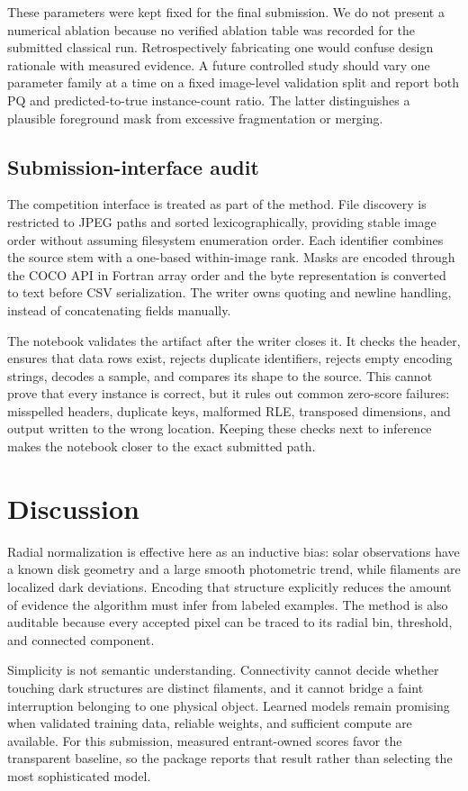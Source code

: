 \documentclass[sigconf]{acmart}
\begin{document}
These parameters were kept fixed for the final submission. We do not present a
numerical ablation because no verified ablation table was recorded for the
submitted classical run. Retrospectively fabricating one would confuse design
rationale with measured evidence. A future controlled study should vary one
parameter family at a time on a fixed image-level validation split and report
both PQ and predicted-to-true instance-count ratio. The latter distinguishes a
plausible foreground mask from excessive fragmentation or merging.

\subsection{Submission-interface audit}
The competition interface is treated as part of the method. File discovery is
restricted to JPEG paths and sorted lexicographically, providing stable image
order without assuming filesystem enumeration order. Each identifier combines
the source stem with a one-based within-image rank. Masks are encoded through
the COCO API in Fortran array order and the byte representation is converted to
text before CSV serialization. The writer owns quoting and newline handling,
instead of concatenating fields manually.

The notebook validates the artifact after the writer closes it. It checks the
header, ensures that data rows exist, rejects duplicate identifiers, rejects
empty encoding strings, decodes a sample, and compares its shape to the source.
This cannot prove that every instance is correct, but it rules out common
zero-score failures: misspelled headers, duplicate keys, malformed RLE,
transposed dimensions, and output written to the wrong location. Keeping these
checks next to inference makes the notebook closer to the exact submitted path.

\section{Discussion}
Radial normalization is effective here as an inductive bias: solar observations
have a known disk geometry and a large smooth photometric trend, while filaments
are localized dark deviations. Encoding that structure explicitly reduces the
amount of evidence the algorithm must infer from labeled examples. The method is
also auditable because every accepted pixel can be traced to its radial bin,
threshold, and connected component.

Simplicity is not semantic understanding. Connectivity cannot decide whether
touching dark structures are distinct filaments, and it cannot bridge a faint
interruption belonging to one physical object. Learned models remain promising
when validated training data, reliable weights, and sufficient compute are
available. For this submission, measured entrant-owned scores favor the
transparent baseline, so the package reports that result rather than selecting
the most sophisticated model.
\end{document}
